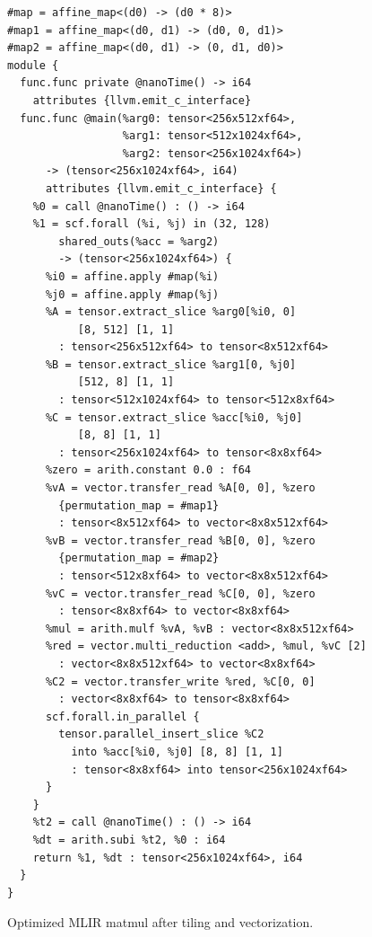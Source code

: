 \documentclass[10pt,twocolumn]{article}
\begin{document}
\begin{figure}[t]
\centering
\begin{verbatim}
#map = affine_map<(d0) -> (d0 * 8)>
#map1 = affine_map<(d0, d1) -> (d0, 0, d1)>
#map2 = affine_map<(d0, d1) -> (0, d1, d0)>
module {
  func.func private @nanoTime() -> i64
    attributes {llvm.emit_c_interface}
  func.func @main(%arg0: tensor<256x512xf64>,
                  %arg1: tensor<512x1024xf64>,
                  %arg2: tensor<256x1024xf64>)
      -> (tensor<256x1024xf64>, i64)
      attributes {llvm.emit_c_interface} {
    %0 = call @nanoTime() : () -> i64
    %1 = scf.forall (%i, %j) in (32, 128)
        shared_outs(%acc = %arg2)
        -> (tensor<256x1024xf64>) {
      %i0 = affine.apply #map(%i)
      %j0 = affine.apply #map(%j)
      %A = tensor.extract_slice %arg0[%i0, 0]
           [8, 512] [1, 1]
        : tensor<256x512xf64> to tensor<8x512xf64>
      %B = tensor.extract_slice %arg1[0, %j0]
           [512, 8] [1, 1]
        : tensor<512x1024xf64> to tensor<512x8xf64>
      %C = tensor.extract_slice %acc[%i0, %j0]
           [8, 8] [1, 1]
        : tensor<256x1024xf64> to tensor<8x8xf64>
      %zero = arith.constant 0.0 : f64
      %vA = vector.transfer_read %A[0, 0], %zero
        {permutation_map = #map1}
        : tensor<8x512xf64> to vector<8x8x512xf64>
      %vB = vector.transfer_read %B[0, 0], %zero
        {permutation_map = #map2}
        : tensor<512x8xf64> to vector<8x8x512xf64>
      %vC = vector.transfer_read %C[0, 0], %zero
        : tensor<8x8xf64> to vector<8x8xf64>
      %mul = arith.mulf %vA, %vB : vector<8x8x512xf64>
      %red = vector.multi_reduction <add>, %mul, %vC [2]
        : vector<8x8x512xf64> to vector<8x8xf64>
      %C2 = vector.transfer_write %red, %C[0, 0]
        : vector<8x8xf64> to tensor<8x8xf64>
      scf.forall.in_parallel {
        tensor.parallel_insert_slice %C2
          into %acc[%i0, %j0] [8, 8] [1, 1]
          : tensor<8x8xf64> into tensor<256x1024xf64>
      }
    }
    %t2 = call @nanoTime() : () -> i64
    %dt = arith.subi %t2, %0 : i64
    return %1, %dt : tensor<256x1024xf64>, i64
  }
}
\end{verbatim}
\caption{Optimized MLIR matmul after tiling and vectorization.}
\label{lst:optimized}
\end{figure}
\end{document}
